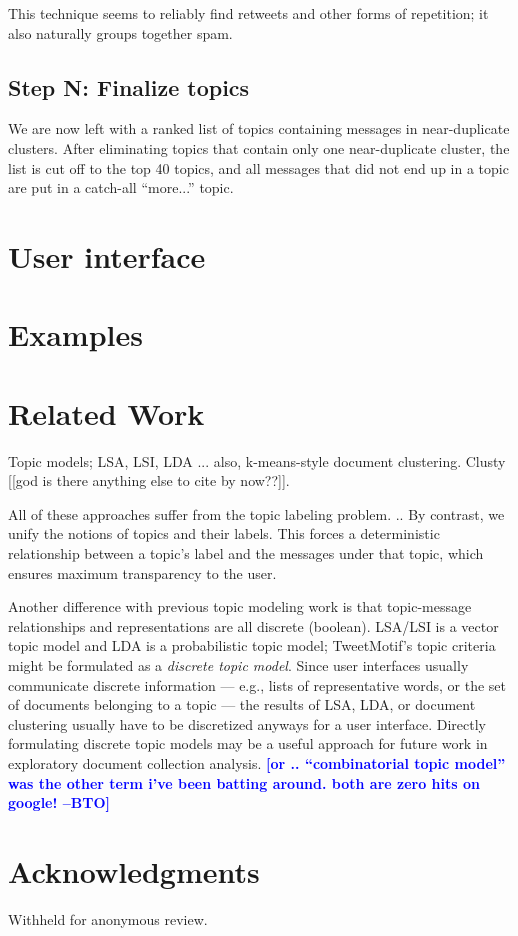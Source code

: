 \documentclass[letterpaper]{article}
\newcommand{\bto}[1]{\textcolor{blue}{\textbf{[#1 --BTO]}}}
\begin{document}
This technique seems to reliably find retweets and other forms of repetition; it also naturally groups together spam.


\subsection{Step N: Finalize topics}

We are now left with a ranked list of topics containing messages in near-duplicate clusters.  After eliminating topics that contain only one near-duplicate cluster, the list is cut off to the top 40 topics, and all messages that did not end up in a topic are put in a catch-all ``more...'' topic.

\section{User interface}

\section{Examples}

\section{Related Work}

Topic models; LSA, LSI, LDA ... also, k-means-style document clustering.  Clusty [[god is there anything else to cite by now??]].

All of these approaches suffer from the topic labeling problem. ..  By contrast, we unify the notions of topics and their labels.  This forces a deterministic relationship between a topic's label and the messages under that topic, which ensures maximum transparency to the user.

Another difference with previous topic modeling work is that topic-message relationships and representations are all discrete (boolean).  LSA/LSI is a vector topic model and LDA is a probabilistic topic model; TweetMotif's topic criteria might be formulated as a \emph{discrete topic model}.  Since user interfaces usually communicate discrete information --- e.g., lists of representative words, or the set of documents belonging to a topic --- the results of LSA, LDA, or document clustering usually have to be discretized anyways for a user interface.  Directly formulating discrete topic models may be a useful approach for future work in exploratory document collection analysis.  \bto{or .. ``combinatorial topic model'' was the other term i've been batting around.  both are zero hits on google!}

\section{Acknowledgments}

Withheld for anonymous review.



\end{document}
